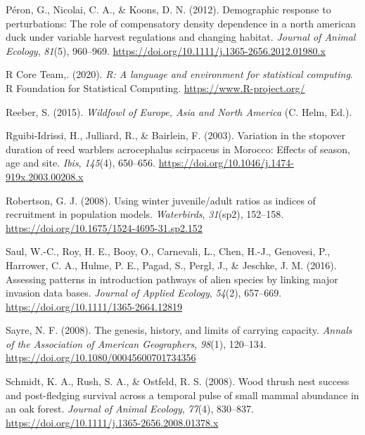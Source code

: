 \documentclass[
  english,
]{article}
\newlength{\cslhangindent}
\newlength{\cslentryspacingunit} %
\newenvironment{CSLReferences}[2] %
 {%
  \setlength{\parindent}{0pt}
  \ifodd #1
  \let\oldpar\par
  \def\par{\hangindent=\cslhangindent\oldpar}
  \fi
  \setlength{\parskip}{#2\cslentryspacingunit}
 }%
 {}
\begin{document}
\begin{CSLReferences}{1}{0}
\leavevmode{}%
Péron, G., Nicolai, C. A., \& Koons, D. N. (2012). Demographic response to perturbations: The role of compensatory density dependence in a north american duck under variable harvest regulations and changing habitat. \emph{Journal of Animal Ecology}, \emph{81}(5), 960--969. \url{https://doi.org/10.1111/j.1365-2656.2012.01980.x}

\leavevmode{}%
R Core Team,. (2020). \emph{{R}: A language and environment for statistical computing}. R Foundation for Statistical Computing. \url{https://www.R-project.org/}

\leavevmode{}%
Reeber, S. (2015). \emph{Wildfowl of {E}urope, {A}sia and {N}orth {A}merica} (C. Helm, Ed.).

\leavevmode{}%
Rguibi-Idrissi, H., Julliard, R., \& Bairlein, F. (2003). Variation in the stopover duration of reed warblers acrocephalus scirpaceus in {M}orocco: Effects of season, age and site. \emph{Ibis}, \emph{145}(4), 650--656. \url{https://doi.org/10.1046/j.1474-919x.2003.00208.x}

\leavevmode{}%
Robertson, G. J. (2008). Using winter juvenile/adult ratios as indices of recruitment in population models. \emph{Waterbirds}, \emph{31}(sp2), 152--158. \url{https://doi.org/10.1675/1524-4695-31.sp2.152}

\leavevmode{}%
Saul, W.-C., Roy, H. E., Booy, O., Carnevali, L., Chen, H.-J., Genovesi, P., Harrower, C. A., Hulme, P. E., Pagad, S., Pergl, J., \& Jeschke, J. M. (2016). Assessing patterns in introduction pathways of alien species by linking major invasion data bases. \emph{Journal of Applied Ecology}, \emph{54}(2), 657--669. \url{https://doi.org/10.1111/1365-2664.12819}

\leavevmode{}%
Sayre, N. F. (2008). The genesis, history, and limits of carrying capacity. \emph{Annals of the Association of American Geographers}, \emph{98}(1), 120--134. \url{https://doi.org/10.1080/00045600701734356}

\leavevmode{}%
Schmidt, K. A., Rush, S. A., \& Ostfeld, R. S. (2008). Wood thrush nest success and post-fledging survival across a temporal pulse of small mammal abundance in an oak forest. \emph{Journal of Animal Ecology}, \emph{77}(4), 830--837. \url{https://doi.org/10.1111/j.1365-2656.2008.01378.x}


\end{CSLReferences}
\end{document}
